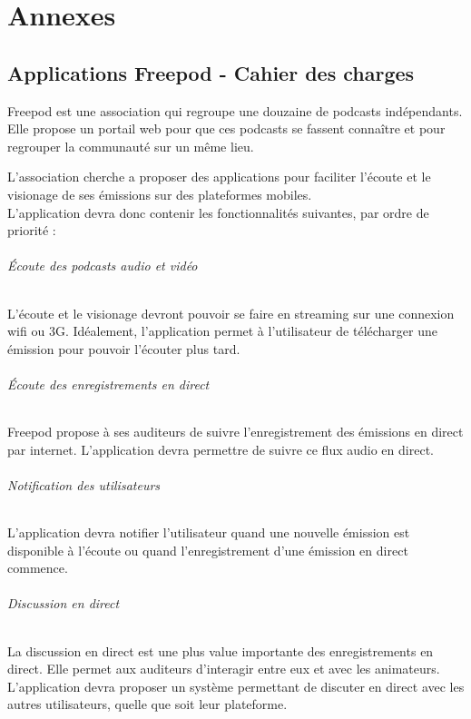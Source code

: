 \documentclass[11pt, french]{report}
\begin{document}
\part*{Annexes}

\appendix

\chapter{Applications Freepod - Cahier des charges}

Freepod est une association qui regroupe une douzaine de podcasts indépendants. Elle propose un portail web pour que ces podcasts se fassent connaître et pour regrouper la communauté sur un même lieu.

L’association cherche a proposer des applications pour faciliter l’écoute et le visionage de ses émissions sur des plateformes mobiles.\\

L’application devra donc contenir les fonctionnalités suivantes, par ordre de priorité :

\paragraph{Écoute des podcasts audio et vidéo}
L’écoute et le visionage devront pouvoir se faire en streaming sur une connexion wifi ou 3G. Idéalement, l’application permet à l’utilisateur de télécharger une émission pour pouvoir l’écouter plus tard.

\paragraph{Écoute des enregistrements en direct}
Freepod propose à ses auditeurs de suivre l’enregistrement des émissions en direct par internet. L’application devra permettre de suivre ce flux audio en direct.

\paragraph{Notification des utilisateurs}
L’application devra notifier l’utilisateur quand une nouvelle émission est disponible à l’écoute ou quand l’enregistrement d’une émission en direct commence.

\paragraph{Discussion en direct}
La discussion en direct est une plus value importante des enregistrements en direct. Elle permet aux auditeurs d'interagir entre eux et avec les animateurs. L’application devra proposer un système permettant de discuter en direct avec les autres utilisateurs, quelle que soit leur plateforme.\\
\end{document}
